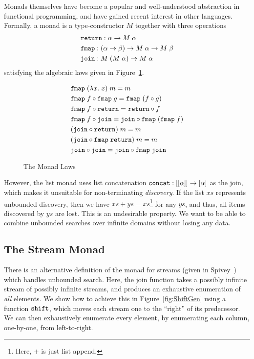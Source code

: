Monads themselves have become a popular and well-understood abstraction in functional programming, and have gained recent interest in other languages. Formally, a monad is a type-constructor $M$ together with three operations 
\begin{align*}
&\texttt{return} : \alpha \rightarrow M\;\alpha\\
&\texttt{fmap} : (\alpha \rightarrow \beta) \rightarrow M\;\alpha \rightarrow M\;\beta\\
&\texttt{join} : M\;(M\;\alpha) \rightarrow M\;\alpha
\end{align*}
satisfying the algebraic laws given in Figure~\ref{fig:MonadLaws}.

\begin{figure}
\begin{align}
&\texttt{fmap}\;(\lambda x.\;x)\;m = m\notag\\
&\texttt{fmap}\;f \circ \texttt{fmap}\;g = \texttt{fmap}\;(f \circ g)\notag\\
&\texttt{fmap}\;f \circ \texttt{return} = \texttt{return}\circ f\notag\\
&\texttt{fmap}\;f \circ \texttt{join} = \texttt{join} \circ \texttt{fmap}\;(\texttt{fmap}\;f)\notag\\
&(\texttt{join} \circ \texttt{return})\;m = m\notag\\
&(\texttt{join} \circ \texttt{fmap}\;\texttt{return})\;m = m\notag\\
&\texttt{join} \circ \texttt{join} = \texttt{join} \circ \texttt{fmap}\;\texttt{join} \label{eq:JoinAssoc}
\end{align}
\caption{The Monad Laws}
\label{fig:MonadLaws}
\end{figure}

However, the list monad uses list concatenation $\texttt{concat} : [[\alpha]] \rightarrow [\alpha]$ as the join, which makes it unsuitable for non-terminating \emph{discovery}. If the list $xs$ represents unbounded discovery, then we have $xs + ys = xs$\footnote{Here, $+$ is just list append.} for any $ys$, and thus, all items discovered by $ys$ are lost. This is an undesirable property. We want to be able to combine unbounded searches over infinite domains without losing any data.

\subsection{The Stream Monad}\label{sec:StreamMonad}
There is an alternative definition of the monad for streams (given in Spivey~\cite{SearchAlgebras}) which handles unbounded search. Here, the join function takes a possibly infinite stream of possibly infinite streams, and produces an exhaustive enumeration of \emph{all} elements. We show how to achieve this in Figure~\ref{fig:ShiftGen} using a function $\texttt{shift}$, which moves each stream one to the ``right'' of its predecessor. We can then exhaustively enumerate every element, by enumerating each column, one-by-one, from left-to-right. 

